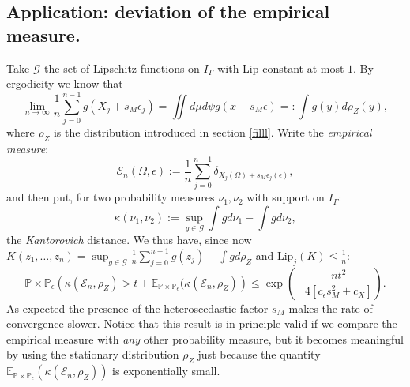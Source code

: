 \documentclass{article}
\newcommand{\1}{\mathbbm{1}}
\begin{document}
\subsection{Application: deviation of the empirical measure.} \label{EEMM} Take $\mathcal{G}$ the set of Lipschitz functions on $I_{\Gamma}$ with Lip constant at most $1.$ By ergodicity we know that 
$$
\lim_{n\rightarrow \infty}\frac1n\sum_{j=0}^{n-1}g(X_j+s_M\epsilon_j)=\iint d\mu d\psi g(x+s_M\epsilon)=:\int g(y)d\rho_Z(y),
$$
where $\rho_Z$ is the distribution introduced in section \ref{filll}.
Write the {\em empirical measure}:
$$
\mathcal{E}_n(\Omega, \epsilon):=\frac1n\sum_{j=0}^{n-1}\delta_{X_j(\Omega)+s_M\epsilon_j(\epsilon)},
$$
and then put, for two probability measures $\nu_1, \nu_2$ with support  on $I_{\Gamma}:$
$$
\kappa (\nu_1, \nu_2):=\sup_{g\in \mathcal{G}}\int gd\nu_1-\int gd\nu_2,
$$
the {\em Kantorovich} distance. We thus have, since now $K(z_1, \dots, z_n)=\sup_{g\in\mathcal{G}}\frac1n\sum_{j=0}^{n-1}g(z_j)-\int gd\rho_Z$ and $\text{Lip}_j(K)\le \frac1n:$
\begin{equation}\label{zet}
\mathbb{P}\times\mathbb{P}_{\epsilon}\left(\kappa (\mathcal{E}_n,\rho_Z)>t+\mathbb{E}_{\mathbb{P}\times\mathbb{P}_{\epsilon}}(\kappa (\mathcal{E}_n,\rho_Z)\right)\le \exp\left(-\frac{nt^2}{4[c_{\epsilon}s_M^2+c_X]}\right).
\end{equation}
As expected the presence of the heteroscedastic factor $s_M$ makes the rate of convergence slower.
Notice that this result is in principle valid if we compare the empirical measure with {\em any} other probability measure, but it becomes  meaningful by using the stationary distribution $\rho_Z$ just because the quantity $\mathbb{E}_{\mathbb{P}\times\mathbb{P}_{\epsilon}}(\kappa (\mathcal{E}_n,\rho_Z))$ is exponentially small. 
\end{document}

